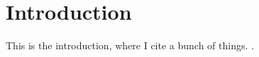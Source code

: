 \section{Introduction}

This is the introduction, where I cite a bunch of
things. \cite{auer2002finite} \cite{xarms08} \cite{kleinberg2008multi}
\cite{auer1995gambling} \cite{pandey2007multi}.
